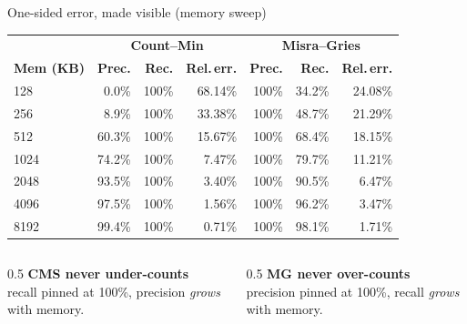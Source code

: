 \documentclass[11pt,aspectratio=169]{beamer}
\begin{document}
\begin{frame}{One-sided error, made visible (memory sweep)}
  \centering
  \scriptsize
  \renewcommand{\arraystretch}{1.15}
  \begin{tabular}{lrrr|rrr}
    \toprule
    & \multicolumn{3}{c|}{\textcolor{sketchcol}{\textbf{Count--Min}}} & \multicolumn{3}{c}{\textcolor{countercol}{\textbf{Misra--Gries}}} \\
    \textbf{Mem (KB)} & \textbf{Prec.} & \textbf{Rec.} & \textbf{Rel.\,err.} & \textbf{Prec.} & \textbf{Rec.} & \textbf{Rel.\,err.} \\
    \midrule
    128  & 0.0\%  & 100\% & 68.14\% & 100\% & 34.2\% & 24.08\% \\
    256  & 8.9\%  & 100\% & 33.38\% & 100\% & 48.7\% & 21.29\% \\
    512  & 60.3\% & 100\% & 15.67\% & 100\% & 68.4\% & 18.15\% \\
    1024 & 74.2\% & 100\% & 7.47\%  & 100\% & 79.7\% & 11.21\% \\
    2048 & 93.5\% & 100\% & 3.40\%  & 100\% & 90.5\% & 6.47\%  \\
    4096 & 97.5\% & 100\% & 1.56\%  & 100\% & 96.2\% & 3.47\%  \\
    8192 & 99.4\% & 100\% & 0.71\%  & 100\% & 98.1\% & 1.71\%  \\
    \bottomrule
  \end{tabular}

  \vspace{0.7em}
  \begin{columns}
    \begin{column}{0.5\textwidth}
      \centering \textcolor{sketchcol}{\textbf{CMS never under-counts}}\\
      recall pinned at 100\%, precision \emph{grows} with memory.
    \end{column}
    \begin{column}{0.5\textwidth}
      \centering \textcolor{countercol}{\textbf{MG never over-counts}}\\
      precision pinned at 100\%, recall \emph{grows} with memory.
    \end{column}
  \end{columns}
\end{frame}
\end{document}
